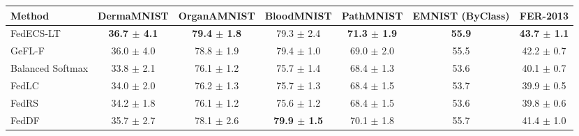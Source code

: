 \begin{tabular}{lcccccc}
\toprule
Method & DermaMNIST & OrganAMNIST & BloodMNIST & PathMNIST & EMNIST (ByClass) & FER-2013\\
\midrule
FedECS-LT & \textbf{36.7 $\pm$ 4.1} & \textbf{79.4 $\pm$ 1.8} & 79.3 $\pm$ 2.4 & \textbf{71.3 $\pm$ 1.9} & \textbf{55.9} & \textbf{43.7 $\pm$ 1.1}\\
GeFL-F & 36.0 $\pm$ 4.0 & 78.8 $\pm$ 1.9 & 79.4 $\pm$ 1.0 & 69.0 $\pm$ 2.0 & 55.5 & 42.2 $\pm$ 0.7\\
Balanced Softmax & 33.8 $\pm$ 2.1 & 76.1 $\pm$ 1.2 & 75.7 $\pm$ 1.4 & 68.4 $\pm$ 1.3 & 53.6 & 40.1 $\pm$ 0.7\\
FedLC & 34.0 $\pm$ 2.0 & 76.2 $\pm$ 1.3 & 75.7 $\pm$ 1.3 & 68.4 $\pm$ 1.5 & 53.7 & 39.9 $\pm$ 0.5\\
FedRS & 34.2 $\pm$ 1.8 & 76.1 $\pm$ 1.2 & 75.6 $\pm$ 1.2 & 68.4 $\pm$ 1.5 & 53.6 & 39.8 $\pm$ 0.6\\
FedDF & 35.7 $\pm$ 2.7 & 78.1 $\pm$ 2.6 & \textbf{79.9 $\pm$ 1.5} & 70.1 $\pm$ 1.8 & 55.7 & 41.4 $\pm$ 1.0\\
\bottomrule
\end{tabular}
